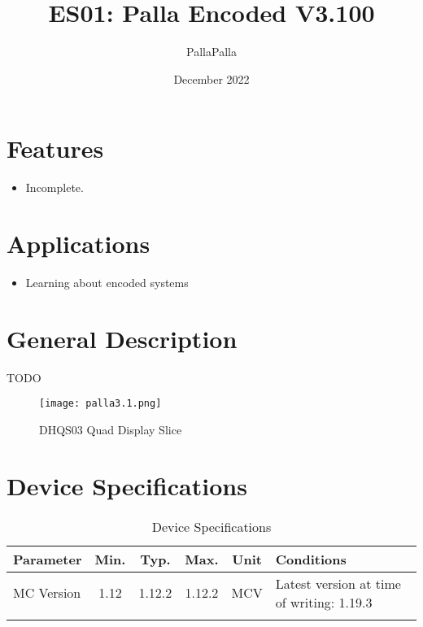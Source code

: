 \documentclass[10pt]{datasheet}
\title{ES01: Palla Encoded V3.100}
\author{PallaPalla}
\date{December 2022}
\begin{document}
\maketitle

\section{Features}

\begin{itemize}
\item{Incomplete.}
\end{itemize}

\section{Applications}

\begin{itemize}
\item{Learning about encoded systems}
\end{itemize}

\section{General Description}

TODO
\vfill\break

\begin{figure}[h]
    \centering
    \texttt{[image: palla3.1.png]}
    \caption{\centering DHQS03 Quad Display Slice}
\end{figure}

\onecolumn

\section{Device Specifications}

\begin{table}[h]
    \caption{Device Specifications}
    \begin{tabularx}{\textwidth}{l | c c c | c | X}
        \thickhline
        \textbf{Parameter} & \textbf{Min.} & \textbf{Typ.} & \textbf{Max.} &
        \textbf{Unit} & \textbf{Conditions} \\
        \hline
        MC Version & 1.12 & 1.12.2 & 1.12.2 & MCV & Latest version at time of writing: 1.19.3\\
        \thickhline
\end{tabularx}
\end{table}
\newpage
\end{document}
